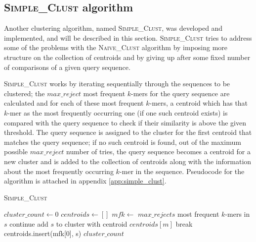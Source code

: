 


\subsection{\textsc{Simple\_Clust} algorithm}

Another clustering algorithm, named \textsc{Simple\_Clust}, was developed and
implemented, and will be described in this section. \textsc{Simple\_Clust}
tries to address some of the problems with the \textsc{Naive\_Clust} algorithm
by imposing more structure on the collection of centroids and by giving up
after some fixed number of comparisons of a given query sequence.

\textsc{Simple\_Clust} works by iterating sequentially through the sequences to
be clustered; the $max\_reject$ most frequent $k$-mers for the query sequence
are calculated and for each of these most frequent $k$-mers, a centroid which
has that $k$-mer as the most frequently occurring one (if one such centroid
exists) is compared with the query sequence to check if their similarity is
above the given threshold. The query sequence is assigned to the cluster for the
first centroid that matches the query sequence; if no such centroid is found,
out of the maximum possible $max\_reject$ number of tries, the query sequence
becomes a centroid for a new cluster and is added to the collection of centroids
along with the information about the most frequently occurring $k$-mer in the
sequence. Pseudocode for the algorithm is attached in appendix \ref{app:simple_clust}.


\begin{algorithm}
  \caption{\textsc{Simple\_Clust}}
  \label{alg:simple_clust}
  \begin{algorithmic}[1]
    \Statex
      \State $cluster\_count \gets 0$
      \State $centroids \gets []$ 
        \State $mfk \gets$ $max\_rejects$ most frequent $k$-mers in $s$
            \State continue
            \State add $s$ to cluster with centroid $centroids[m]$
            \State break
          \EndIf
        \EndFor
          \State centroids.insert(mfk[0], s)
        \EndIf
      \EndFor
      \State \Return $cluster\_count$
    \EndFunction
  \end{algorithmic}
\end{algorithm}

